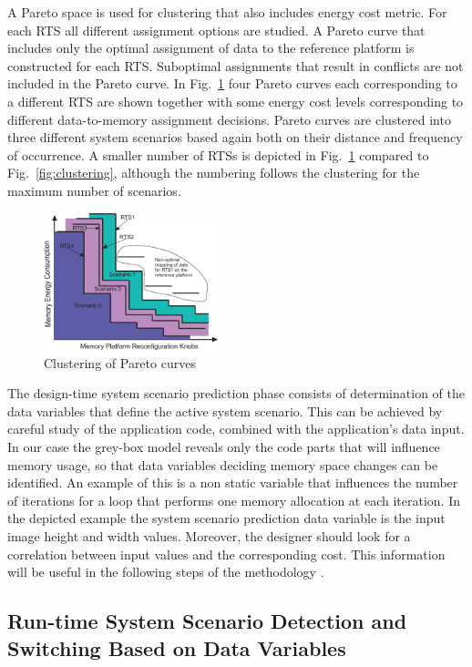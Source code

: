 \documentclass[a4paper,conference]{IEEEtran}
\begin{document}
A Pareto space is used for clustering that also includes energy cost metric. For each RTS all different assignment options are studied. A Pareto curve that includes only the optimal assignment of data to the reference platform is constructed for each RTS. Suboptimal assignments that result in conflicts are not included in the Pareto curve. In Fig.~\ref{fig:pareto} four Pareto curves each corresponding to a different RTS are shown together with some energy cost levels corresponding to different data-to-memory assignment decisions. Pareto curves are clustered into three different system scenarios based again both on their distance and frequency of occurrence. A smaller number of RTSs is depicted in Fig.~\ref{fig:pareto} compared to Fig.~\ref{fig:clustering}, although the numbering follows the clustering for the maximum number of scenarios. 

\begin{figure}[!t]
\centering
\includegraphics[width=0.45\textwidth]{Images/2DClustering.eps}
\caption{Clustering of Pareto curves}
\label{fig:pareto}
\end{figure}

The design-time system scenario prediction phase consists of determination of the data variables that define the active system scenario. This can be achieved by careful study of the application code, combined with the application's data input. In our case the grey-box model reveals only the code parts that will influence memory usage, so that data variables deciding memory space changes can be identified. An example of this is a non static variable that influences the number of iterations for a loop that performs one memory allocation at each iteration. In the depicted example the system scenario prediction data variable is the input image height and width values. Moreover, the designer should look for a correlation between input values and the corresponding cost. This information will be useful in the following steps of the methodology \cite{tcm}.

\subsection{Run-time System Scenario Detection and Switching Based on Data Variables}
\end{document}
